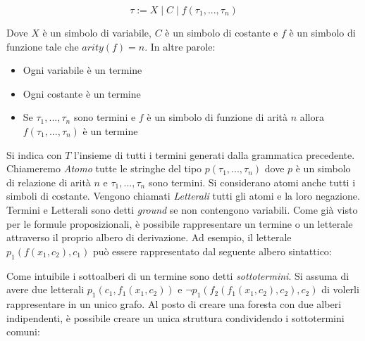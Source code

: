 \documentclass[./main.tex]{subfiles}
\begin{document}
$$ \tau := X \mid C \mid f(\tau_1, ..., \tau_n) $$

Dove $X$ è un simbolo di variabile, $C$ è un simbolo di costante e $f$ è un simbolo di funzione tale che $arity(f) = n$. In altre parole:
\begin{itemize}
  \item Ogni variabile è un termine
  \item Ogni costante è un termine
  \item Se $\tau_1, ..., \tau_n$ sono termini e $f$ è un simbolo di funzione di arità $n$ allora $f(\tau_1, ..., \tau_n)$ è un termine
\end{itemize}

Si indica con $T$ l'insieme di tutti i termini generati dalla grammatica precedente.
Chiameremo \textit{Atomo} tutte le stringhe del tipo $p(\tau_1, ..., \tau_n)$ dove $p$ è un simbolo di relazione
di arità $n$ e $\tau_1, ..., \tau_n$ sono termini.
Si considerano atomi anche tutti i simboli di costante.
Vengono chiamati \textit{Letterali} tutti gli atomi e la loro negazione.
Termini e Letterali sono detti \textit{ground} se non contengono variabili.
Come già visto per le formule proposizionali, è possibile rappresentare un termine o un letterale
attraverso il proprio albero di derivazione. Ad esempio, il letterale $p_1(f(x_1, c_2), c_1)$ può essere rappresentato dal seguente albero sintattico:

\begin{center}
\end{center}

Come intuibile i sottoalberi di un termine sono detti \textit{sottotermini}. Si assuma di avere due letterali $p_1(c_1, f_1(x_1, c_2))$ e 
$\lnot p_1(f_2(f_1(x_1, c_2), c_2), c_2)$ di volerli rappresentare in un unico grafo. Al posto di creare una foresta con due alberi indipendenti,
è possibile creare un unica struttura condividendo i sottotermini comuni:
\end{document}
